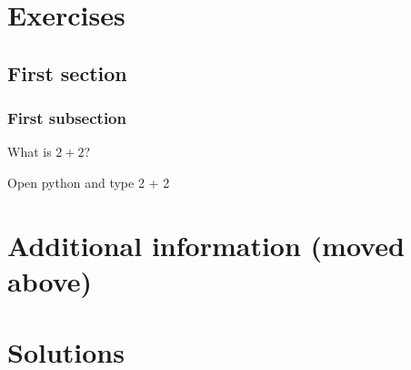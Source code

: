 \documentclass{book}
\begin{document}
\chapter{Exercises}

\section{First section}

\subsection{First subsection}

\begin{exercise}[subtitle={Simple Addition}]
  What is \(2 + 2\)?
\end{exercise}

\begin{additionalinformation}
Open python and type 2 + 2
\end{additionalinformation}

\chapter{Additional information (moved above)}

\chapter{Solutions}
\end{document}
